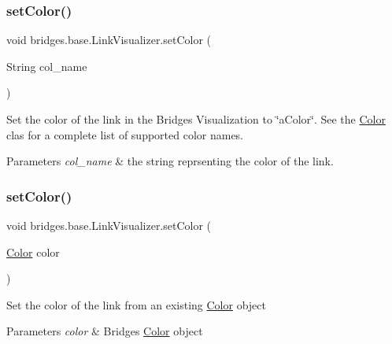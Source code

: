 \subsubsection{\texorpdfstring{setColor()}{setColor()}\hspace{0.1cm}{\footnotesize\ttfamily [1/3]}}
{\footnotesize\ttfamily void bridges.\+base.\+Link\+Visualizer.\+set\+Color (\begin{DoxyParamCaption}\item[{String}]{col\+\_\+name }\end{DoxyParamCaption})}

Set the color of the link in the Bridges Visualization to \char`\"{}a\+Color\char`\"{}. See the \mbox{\hyperlink{classbridges_1_1base_1_1_color}{Color}} clas for a complete list of supported color names.


\begin{DoxyParams}{Parameters}
{\em col\+\_\+name} & the string reprsenting the color of the link. \\
\hline
\end{DoxyParams}
\mbox{\label{classbridges_1_1base_1_1_link_visualizer_ab05a7576f99818937276a4937eedeee1}} 
\subsubsection{\texorpdfstring{setColor()}{setColor()}\hspace{0.1cm}{\footnotesize\ttfamily [2/3]}}
{\footnotesize\ttfamily void bridges.\+base.\+Link\+Visualizer.\+set\+Color (\begin{DoxyParamCaption}\item[{\mbox{\hyperlink{classbridges_1_1base_1_1_color}{Color}}}]{color }\end{DoxyParamCaption})}

Set the color of the link from an existing \mbox{\hyperlink{classbridges_1_1base_1_1_color}{Color}} object 
\begin{DoxyParams}{Parameters}
{\em color} & Bridges \mbox{\hyperlink{classbridges_1_1base_1_1_color}{Color}} object \\
\hline
\end{DoxyParams}
\mbox{\label{classbridges_1_1base_1_1_link_visualizer_a003905cfe33e1704555b2b3a1cf99bad}} 
